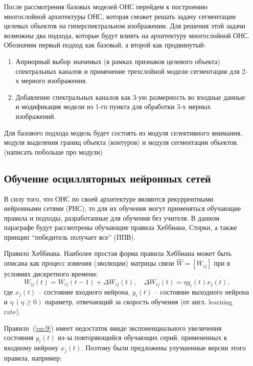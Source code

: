 \documentclass[14pt, russian]{scrartcl}
\begin{document}
После рассмотрения базовых моделей ОНС перейдем к построению многослойной архитектуры ОНС,
которая сможет решать задачу сегментации целевых объектов на гиперспектральном изображении.
Для решения этой задачи возможны два подхода, которые будут влиять на архитектуру многослойной ОНС.
Обозначим первый подход как базовый, а второй как продвинутый:

\begin{enumerate}
    \item Априорный выбор значимых (в рамках признаков целевого объекта) спектральных каналов и применение трехслойной модели сегментации для 2-х мерного изображения.
    \item Добавление спектральных каналов как 3-ую размерность во входные данные и модификация модели из 1-го пункта для обработки 3-х мерных изображений.
\end{enumerate}

Для базового подхода модель будет состоять из модуля селективного внимания, модуля выделения границ объекта (контуров) и модуля сегментации объектов.
(написать побольше про модули)

\subsection{Обучение осцилляторных нейронных сетей}

В силу того, что ОНС по своей архитектуре являются рекуррентными нейронными сетями (РНС), то для их обучения могут применяться обучающие правила и подходы, разработанные для обучения без учителя. В данном параграфе будут рассмотрены обучающие правила Хеббиана, Сторки, а также принцип “победитель получает все” (ППВ).

Правило Хеббиана. Наиболее простая форма правила Хеббиана может быть описана как процесс измения (эволюции) матрицы связи $\hat{W} = [W_{ij}]$ при в условиях дискретного времени:
\begin{equation}\label{eq:9}
    W_{ij}(t) = W_{ij}(t-1) + \Delta W_{ij}(t), \quad \Delta W_{ij}(t) = \eta y_i(t) x_j(t), 
\end{equation}где $x_{j}(t)$ -- состояние входного нейрона, $y_i(t)$ -- состояние выходного нейрона и $\eta \ (\eta \geq 0)$ параметр, отвечающий за скорость обучения (от англ. learning rate).

Правило~(\ref{eq:9}) имеет недостаток ввиде экспоненциального увеличения состояния $y_i(t)$ из-за повторяющийся обучающих серий, примененных к входному нейрону $x_{j}(t)$. Поэтому были предложены улучшенные версии этого правила, например:
\end{document}
